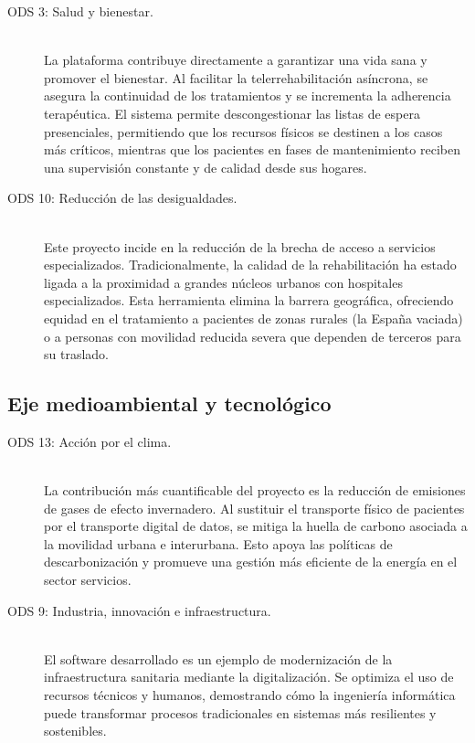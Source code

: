 \begin{description}
    \item[ODS 3: Salud y bienestar\cite{pactomundialODS3}.] \hfill \\
    La plataforma contribuye directamente a garantizar una vida sana y promover el bienestar. Al facilitar la telerrehabilitación asíncrona, se asegura la continuidad de los tratamientos y se incrementa la adherencia terapéutica. El sistema permite descongestionar las listas de espera presenciales, permitiendo que los recursos físicos se destinen a los casos más críticos, mientras que los pacientes en fases de mantenimiento reciben una supervisión constante y de calidad desde sus hogares.

    \item[ODS 10: Reducción de las desigualdades\cite{pactomundialODS10}.] \hfill \\
    Este proyecto incide en la reducción de la brecha de acceso a servicios especializados. Tradicionalmente, la calidad de la rehabilitación ha estado ligada a la proximidad a grandes núcleos urbanos con hospitales especializados. Esta herramienta elimina la barrera geográfica, ofreciendo equidad en el tratamiento a pacientes de zonas rurales (la España vaciada) o a personas con movilidad reducida severa que dependen de terceros para su traslado.
\end{description}

\subsection{Eje medioambiental y tecnológico}

\begin{description}
    \item[ODS 13: Acción por el clima\cite{pactomundialODS13}.] \hfill \\
    La contribución más cuantificable del proyecto es la reducción de emisiones de gases de efecto invernadero. Al sustituir el transporte físico de pacientes por el transporte digital de datos, se mitiga la huella de carbono asociada a la movilidad urbana e interurbana. Esto apoya las políticas de descarbonización y promueve una gestión más eficiente de la energía en el sector servicios.

    \item[ODS 9: Industria, innovación e infraestructura\cite{pactomundialODS9}.] \hfill \\
    El software desarrollado es un ejemplo de modernización de la infraestructura sanitaria mediante la digitalización. Se optimiza el uso de recursos técnicos y humanos, demostrando cómo la ingeniería informática puede transformar procesos tradicionales en sistemas más resilientes y sostenibles.
\end{description}



